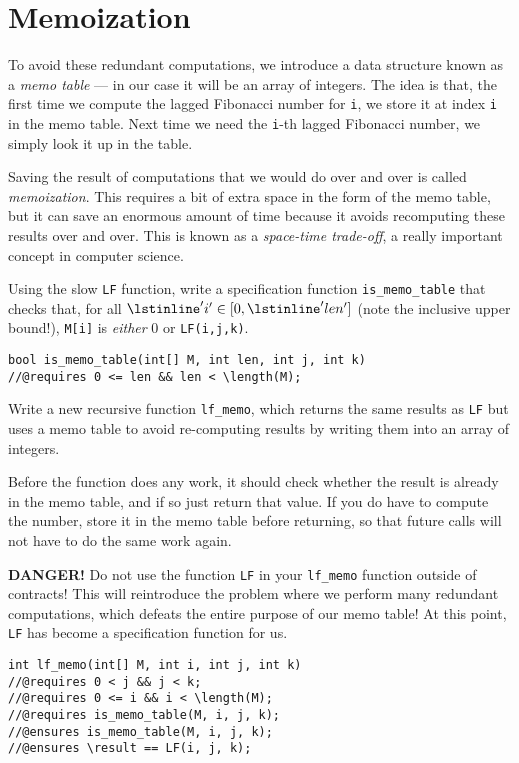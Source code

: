 \section*{Memoization}

To avoid these redundant computations, we introduce a data structure
known as a \emph{memo table} --- in our case it will be an array of
integers.  The idea is that, the first time we compute the lagged
Fibonacci number for \lstinline'i', we store it at index \lstinline'i'
in the memo table.  Next time we need the \lstinline'i'-th
lagged Fibonacci number, we simply look it up in the table.

Saving the result of computations that we would do over and over is
called \emph{memoization}.  This requires a bit of extra space in the
form of the memo table, but it can save an enormous amount of time because
it avoids recomputing these results over and over.  This is known as a
\emph{space-time trade-off}, a really important concept in computer science.

\begin{part}
  Using the slow \lstinline'LF' function, write a specification
  function \lstinline'is_memo_table' that checks that, for all
  $\lstinline'i' \in [0, \lstinline'len']$ (note the inclusive upper
  bound!), \lstinline'M[i]' is \emph{either} 0 or
  \lstinline'LF(i,j,k)'.

\begin{lstlisting}
bool is_memo_table(int[] M, int len, int j, int k)
//@requires 0 <= len && len < \length(M);
\end{lstlisting}
\onePT[-1ex]
\end{part}

\begin{part}
  Write a new recursive function \lstinline'lf_memo', which returns
  the same results as \lstinline'LF' but uses a memo table to avoid
  re-computing results by writing them into an array of integers.

  Before the function does any work, it should check whether the
  result is already in the memo table, and if so just return that
  value.  If you do have to compute the number, store it in the memo
  table before returning, so that future calls will not have to do the
  same work again.

  \textbf{DANGER!} Do not use the function \lstinline'LF' in your
  \lstinline'lf_memo' function outside of contracts!  This will
  reintroduce the problem where we perform many redundant
  computations, which defeats the entire purpose of our memo table!
  At this point, \lstinline'LF' has become a specification function
  for us.

\begin{lstlisting}[belowskip=0pt]
int lf_memo(int[] M, int i, int j, int k)
//@requires 0 < j && j < k;
//@requires 0 <= i && i < \length(M);
//@requires is_memo_table(M, i, j, k);
//@ensures is_memo_table(M, i, j, k);
//@ensures \result == LF(i, j, k);
\end{lstlisting}
\end{part}

